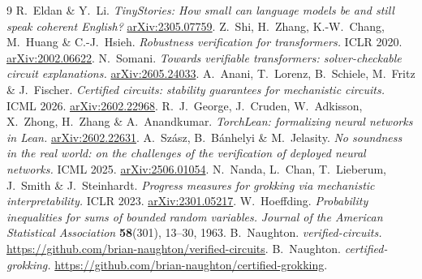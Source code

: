 \documentclass[11pt,a4paper]{article}
\begin{document}
\begin{thebibliography}{9}
\footnotesize
\setlength{\itemsep}{1pt}
\setlength{\parsep}{0pt}
 R.~Eldan \& Y.~Li. \emph{TinyStories: How small can language models be and still speak coherent English?} \href{https://arxiv.org/abs/2305.07759}{arXiv:2305.07759}.
 Z.~Shi, H.~Zhang, K.-W.~Chang, M.~Huang \& C.-J.~Hsieh. \emph{Robustness verification for transformers.} ICLR 2020. \href{https://arxiv.org/abs/2002.06622}{arXiv:2002.06622}.
 N.~Somani. \emph{Towards verifiable transformers: solver-checkable circuit explanations.} \href{https://arxiv.org/abs/2605.24033}{arXiv:2605.24033}.
 A.~Anani, T.~Lorenz, B.~Schiele, M.~Fritz \& J.~Fischer. \emph{Certified circuits: stability guarantees for mechanistic circuits.} ICML 2026. \href{https://arxiv.org/abs/2602.22968}{arXiv:2602.22968}.
 R.~J.~George, J.~Cruden, W.~Adkisson, X.~Zhong, H.~Zhang \& A.~Anandkumar. \emph{TorchLean: formalizing neural networks in Lean.} \href{https://arxiv.org/abs/2602.22631}{arXiv:2602.22631}.
 A.~Szász, B.~Bánhelyi \& M.~Jelasity. \emph{No soundness in the real world: on the challenges of the verification of deployed neural networks.} ICML 2025. \href{https://arxiv.org/abs/2506.01054}{arXiv:2506.01054}.
 N.~Nanda, L.~Chan, T.~Lieberum, J.~Smith \& J.~Steinhardt. \emph{Progress measures for grokking via mechanistic interpretability.} ICLR 2023. \href{https://arxiv.org/abs/2301.05217}{arXiv:2301.05217}.
 W.~Hoeffding. \emph{Probability inequalities for sums of bounded random variables.} \emph{Journal of the American Statistical Association} \textbf{58}(301), 13--30, 1963.
 B.~Naughton. \emph{verified-circuits.} \url{https://github.com/brian-naughton/verified-circuits}.
 B.~Naughton. \emph{certified-grokking.} \url{https://github.com/brian-naughton/certified-grokking}.
\end{thebibliography}
\end{document}
